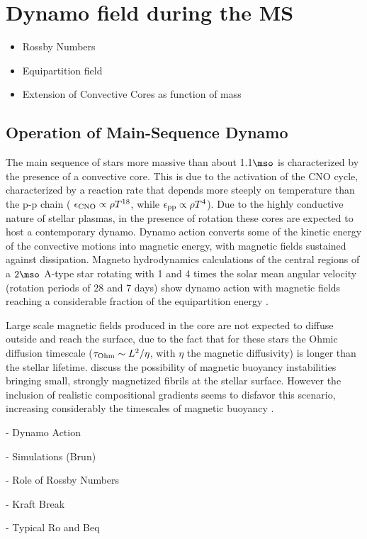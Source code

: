 
  \section{Dynamo field during the MS}
\begin{itemize}
\item Rossby Numbers
\item Equipartition field
\item Extension of Convective Cores as function of mass
\end{itemize}


\subsection{Operation of Main-Sequence Dynamo}
The main sequence of stars more massive than about 1.1$\mso$ is characterized by the presence of a convective core.
This is due to the activation of the CNO cycle, characterized by a reaction rate that depends more steeply on temperature than the p-p chain ( $\epsilon_{\rm CNO}\propto \rho T^{18}$, while  $\epsilon_{\rm pp}\propto \rho T^{4}$).
Due to the highly conductive nature of stellar plasmas, in the presence of rotation
these cores are expected to host a contemporary dynamo. Dynamo action converts some of the kinetic energy 
of the convective motions into magnetic energy, with magnetic fields sustained against dissipation.
Magneto hydrodynamics calculations of the central regions of a  $2\mso$ A-type star rotating with 
1 and 4 times the solar mean angular velocity (rotation periods of 28 and 7 days) show dynamo action 
with magnetic fields reaching a considerable fraction of the equipartition energy \citep{Brun_2005}.

Large scale magnetic fields produced in the core are not expected to diffuse outside and reach the surface, due to the fact that for these stars the Ohmic diffusion timescale ($\tau_{\rm Ohm}\sim L^2/\eta$, with $\eta$ the magnetic diffusivity) is longer than the stellar lifetime. \citet{MacGregor_2003} discuss the possibility of magnetic buoyancy instabilities bringing small, strongly magnetized fibrils at the stellar surface. However the inclusion of realistic compositional gradients seems to disfavor this scenario, increasing considerably the timescales of magnetic buoyancy \cite{MacDonald_2004}.  



- Dynamo Action

- Simulations (Brun)

- Role of Rossby Numbers

- Kraft Break
  
- Typical Ro and Beq   
  
  
  
  
